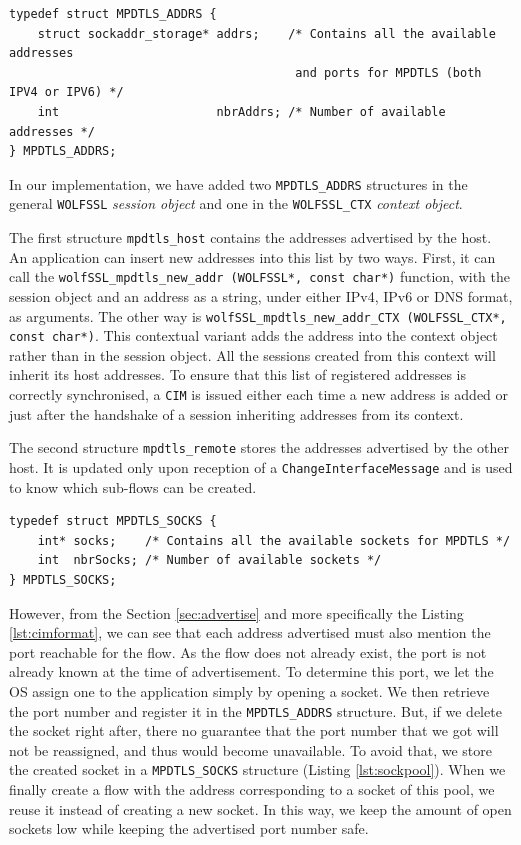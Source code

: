 
\begin{lstlisting}[caption=Structure storing addresses]
typedef struct MPDTLS_ADDRS {
    struct sockaddr_storage* addrs;    /* Contains all the available addresses
                                        and ports for MPDTLS (both IPV4 or IPV6) */
    int                      nbrAddrs; /* Number of available addresses */
} MPDTLS_ADDRS;
\end{lstlisting}

In our implementation, we have added two \texttt{MPDTLS\_ADDRS} structures in the general \texttt{WOLFSSL} \textit{session object} and one in the \texttt{WOLFSSL\_CTX} \textit{context object}.

The first structure \texttt{mpdtls\_host} contains the addresses advertised by the host. An application can insert new addresses into this list by two ways. First, it can call the \texttt{wolfSSL\_mpdtls\_new\_addr (WOLFSSL*, const char*)} function, with the session object and an address as a string, under either IPv4, IPv6 or DNS format, as arguments. The other way is \texttt{wolfSSL\_mpdtls\_new\_addr\_CTX (WOLFSSL\_CTX*, const char*)}. This contextual variant adds the address into the context object rather than in the session object. All the sessions created from this context will inherit its host addresses. To ensure that this list of registered addresses is correctly synchronised, a \texttt{CIM} is issued either each time a new address is added or just after the handshake of a session inheriting addresses from its context.

The second structure \texttt{mpdtls\_remote} stores the addresses advertised by the other host. It is updated only upon reception of a \texttt{ChangeInterfaceMessage} and is used to know which sub-flows can be created.

\begin{lstlisting}[caption=Structure containing inactive socket,label=lst:sockpool]
typedef struct MPDTLS_SOCKS {
    int* socks;    /* Contains all the available sockets for MPDTLS */
    int  nbrSocks; /* Number of available sockets */
} MPDTLS_SOCKS;
\end{lstlisting}

However, from the Section \ref{sec:advertise} and more specifically the Listing \ref{lst:cimformat}, we can see that each address advertised must also mention the port reachable for the flow. As the flow does not already exist, the port is not already known at the time of advertisement. To determine this port, we let the OS assign one to the application simply by opening a socket. We then retrieve the port number and register it in the \texttt{MPDTLS\_ADDRS} structure. But, if we delete the socket right after, there no guarantee that the port number that we got will not be reassigned, and thus would become unavailable. To avoid that, we store the created socket in a \texttt{MPDTLS\_SOCKS} structure (Listing \ref{lst:sockpool}). When we finally create a flow with the address corresponding to a socket of this pool, we reuse it instead of creating a new socket. In this way, we keep the amount of open sockets low while keeping the advertised port number safe.

